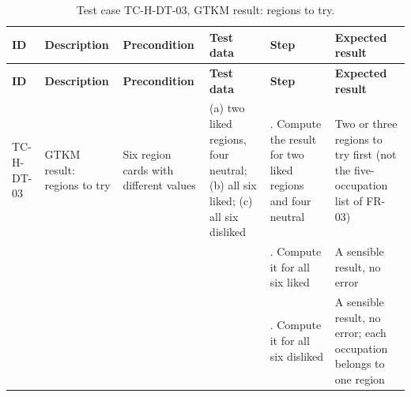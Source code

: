 {\footnotesize{}\renewcommand{\arraystretch}{1.1}
\begin{longtable}{|>{\raggedright\arraybackslash}p{}|>{\raggedright\arraybackslash}p{}|>{\raggedright\arraybackslash}p{}|>{\raggedright\arraybackslash}p{}|>{\raggedright\arraybackslash}p{}|>{\raggedright\arraybackslash}p{}|}
\caption{Test case TC-H-DT-03, GTKM result: regions to try.} \\
\hline
\textbf{ID} & \textbf{Description} & \textbf{Precondition} & \textbf{Test data} & \textbf{Step} & \textbf{Expected result} \\ \hline
\endfirsthead
\hline
\textbf{ID} & \textbf{Description} & \textbf{Precondition} & \textbf{Test data} & \textbf{Step} & \textbf{Expected result} \\ \hline
\endhead
TC-H-DT-03 & GTKM result: regions to try & Six region cards with different values & (a) two liked regions, four neutral; (b) all six liked; (c) all six disliked & 1. Compute the result for two liked regions and four neutral & Two or three regions to try first (not the five-\allowbreak{}occupation list of FR-03) \\ \cline{5-6}
 &  &  &  & 2. Compute it for all six liked & A sensible result, no error \\ \cline{5-6}
 &  &  &  & 3. Compute it for all six disliked & A sensible result, no error; each occupation belongs to one region \\ \hline
\end{longtable}
}


